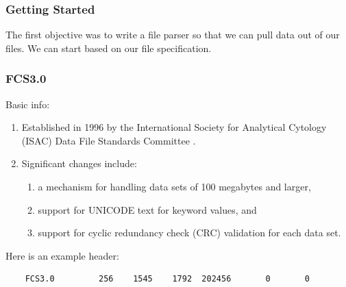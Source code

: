 \documentclass{beamer}
\begin{document}
\begin{frame}[fragile]
  \frametitle{Getting Started} The first objective was to write a file
  parser so that we can pull data out of our files. We can start based
  on our file specification\cite{spidlen2021data}.
\end{frame}
\begin{frame}[fragile]
  \frametitle{FCS3.0}
  Basic info:
  \begin{enumerate}
  \item Established in 1996 by the International Society for
    Analytical Cytology (ISAC) Data File Standards Committee
    \cite{standards1996}.
  \item Significant changes include:
    \begin{enumerate}
    \item a mechanism for handling data sets of 100 megabytes and larger, 
    \item support for UNICODE text for keyword values, and 
    \item support for cyclic redundancy check (CRC) validation for
      each data set.
    \end{enumerate}
  \end{enumerate}
  Here is an example header:
  \begin{lstlisting}
    FCS3.0         256    1545    1792  202456       0       0 
  \end{lstlisting}
\end{frame}
\end{document}
